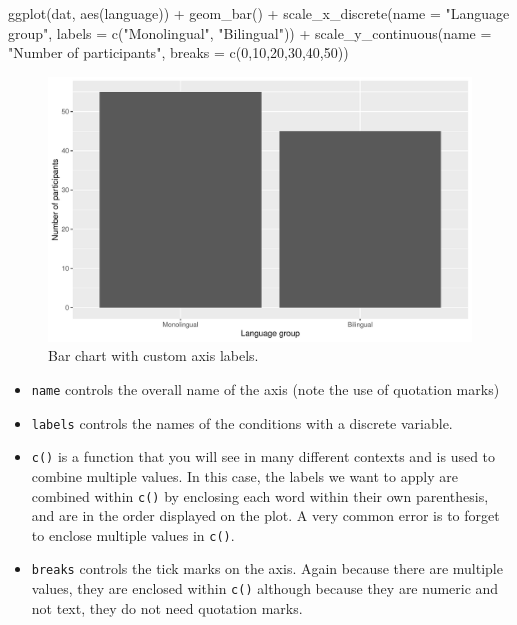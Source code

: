 \documentclass[
  english,
  doc,floatsintext]{apa6}
\newenvironment{Shaded}{\begin{snugshade}}{\end{snugshade}}
\newcommand{\AttributeTok}[1]{\textcolor[rgb]{0.77,0.63,0.00}{#1}}
\newcommand{\DecValTok}[1]{\textcolor[rgb]{0.00,0.00,0.81}{#1}}
\newcommand{\FunctionTok}[1]{\textcolor[rgb]{0.00,0.00,0.00}{#1}}
\newcommand{\NormalTok}[1]{#1}
\newcommand{\SpecialCharTok}[1]{\textcolor[rgb]{0.00,0.00,0.00}{#1}}
\newcommand{\StringTok}[1]{\textcolor[rgb]{0.31,0.60,0.02}{#1}}
\begin{document}
\begin{Shaded}
\begin{Highlighting}[]
\FunctionTok{ggplot}\NormalTok{(dat, }\FunctionTok{aes}\NormalTok{(language)) }\SpecialCharTok{+}
  \FunctionTok{geom\_bar}\NormalTok{() }\SpecialCharTok{+}
  \FunctionTok{scale\_x\_discrete}\NormalTok{(}\AttributeTok{name =} \StringTok{"Language group"}\NormalTok{, }
                   \AttributeTok{labels =} \FunctionTok{c}\NormalTok{(}\StringTok{"Monolingual"}\NormalTok{, }\StringTok{"Bilingual"}\NormalTok{)) }\SpecialCharTok{+}
  \FunctionTok{scale\_y\_continuous}\NormalTok{(}\AttributeTok{name =} \StringTok{"Number of participants"}\NormalTok{,}
                     \AttributeTok{breaks =} \FunctionTok{c}\NormalTok{(}\DecValTok{0}\NormalTok{,}\DecValTok{10}\NormalTok{,}\DecValTok{20}\NormalTok{,}\DecValTok{30}\NormalTok{,}\DecValTok{40}\NormalTok{,}\DecValTok{50}\NormalTok{))}
\end{Highlighting}
\end{Shaded}

\begin{figure}

{\centering \includegraphics[width=1\linewidth]{images/bar3-1} 

}

\caption{Bar chart with custom axis labels.}\label{fig:bar3}
\end{figure}

\begin{itemize}
\item
  \texttt{name} controls the overall name of the axis (note the use of quotation marks)
\item
  \texttt{labels} controls the names of the conditions with a discrete variable.
\item
  \texttt{c()} is a function that you will see in many different contexts and is used to combine multiple values. In this case, the labels we want to apply are combined within \texttt{c()} by enclosing each word within their own parenthesis, and are in the order displayed on the plot. A very common error is to forget to enclose multiple values in \texttt{c()}.
\item
  \texttt{breaks} controls the tick marks on the axis. Again because there are multiple values, they are enclosed within \texttt{c()} although because they are numeric and not text, they do not need quotation marks.
\end{itemize}
\end{document}
